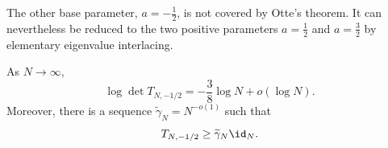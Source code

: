 The other base parameter, $a=-\frac12$, is not covered by Otte's theorem.  It
can nevertheless be reduced to the two positive parameters $a=\frac12$ and
$a=\frac32$ by elementary eigenvalue interlacing.

\begin{proposition}\label{prop:negative-half-base}
As $N\to\infty$,
\begin{equation}\label{eq:negative-half-det}
 \log\det T_{N,-1/2}=-\frac38\log N+o(\log N).
\end{equation}
Moreover, there is a sequence $\widetilde\gamma_N=N^{-o(1)}$ such that
\begin{equation}\label{eq:negative-half-coercivity}
 T_{N,-1/2}\ge\widetilde\gamma_N\id_N.
\end{equation}
\end{proposition}


